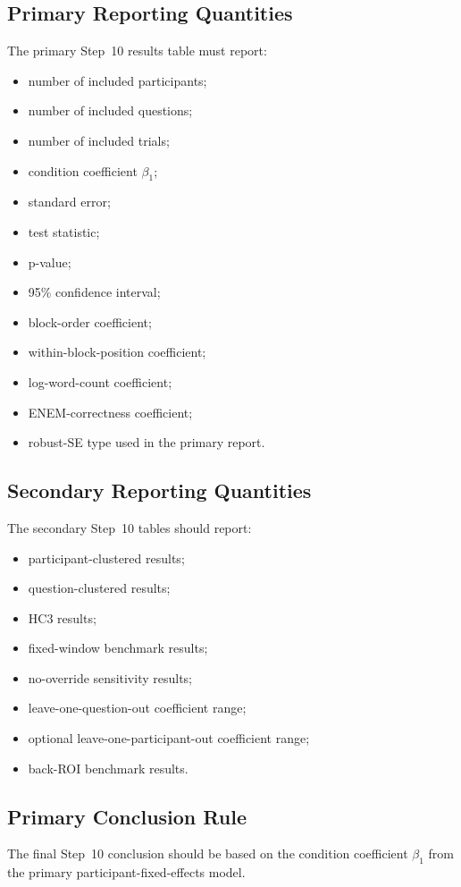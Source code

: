 \subsection{Primary Reporting Quantities}
The primary Step~10 results table must report:
\begin{itemize}
    \item number of included participants;
    \item number of included questions;
    \item number of included trials;
    \item condition coefficient \(\beta_1\);
    \item standard error;
    \item test statistic;
    \item p-value;
    \item 95\% confidence interval;
    \item block-order coefficient;
    \item within-block-position coefficient;
    \item log-word-count coefficient;
    \item ENEM-correctness coefficient;
    \item robust-SE type used in the primary report.
\end{itemize}

\subsection{Secondary Reporting Quantities}
The secondary Step~10 tables should report:
\begin{itemize}
    \item participant-clustered results;
    \item question-clustered results;
    \item HC3 results;
    \item fixed-window benchmark results;
    \item no-override sensitivity results;
    \item leave-one-question-out coefficient range;
    \item optional leave-one-participant-out coefficient range;
    \item back-ROI benchmark results.
\end{itemize}

\subsection{Primary Conclusion Rule}
The final Step~10 conclusion should be based on the condition coefficient \(\beta_1\) from the
primary participant-fixed-effects model.

